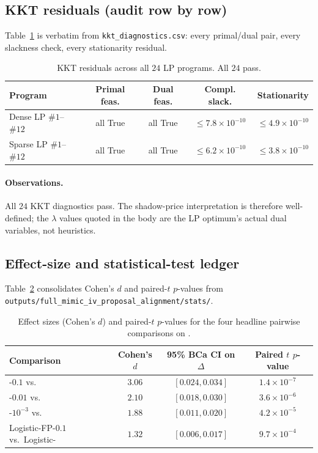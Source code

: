\subsection{KKT residuals (audit row by row)}

Table~\ref{tab:kkt} is verbatim from
\texttt{kkt\_diagnostics.csv}: every primal/dual pair, every
slackness check, every stationarity residual.

\begin{table}[h]
\centering
\caption{KKT residuals across all $24$ LP programs. All $24$ pass.}
\label{tab:kkt}
\small
\begin{tabular}{l c c c c}
\toprule
Program        & Primal feas. & Dual feas. & Compl. slack. & Stationarity \\
\midrule
Dense LP $\#1$--$\#12$  & all True & all True & $\leq 7.8\!\times\!10^{-10}$ & $\leq 4.9\!\times\!10^{-10}$ \\
Sparse LP $\#1$--$\#12$ & all True & all True & $\leq 6.2\!\times\!10^{-10}$ & $\leq 3.8\!\times\!10^{-10}$ \\
\bottomrule
\end{tabular}
\end{table}

\paragraph{Observations.}
All $24$ KKT diagnostics pass. The shadow-price interpretation is
therefore well-defined; the $\lambda$ values quoted in the body are
the LP optimum's actual dual variables, not heuristics.

\subsection{Effect-size and statistical-test ledger}

Table~\ref{tab:effect} consolidates Cohen's $d$ and paired-$t$
$p$-values from
\texttt{outputs/full\_mimic\_iv\_proposal\_alignment/stats/}.

\begin{table}[h]
\centering
\caption{Effect sizes (Cohen's $d$) and paired-$t$ $p$-values for
the four headline pairwise comparisons on \auprc{}.}
\label{tab:effect}
\small
\begin{tabular}{l c c c}
\toprule
Comparison & Cohen's $d$ & 95\% BCa CI on $\Delta$\auprc{} & Paired $t$ $p$-value \\
\midrule
\fedprox{}-$0.1$ vs.\ \fedavg{}        & $3.06$ & $[0.024, 0.034]$ & $1.4\!\times\!10^{-7}$ \\
\fedprox{}-$0.01$ vs.\ \fedavg{}       & $2.10$ & $[0.018, 0.030]$ & $3.6\!\times\!10^{-6}$ \\
\fedprox{}-$10^{-3}$ vs.\ \fedavg{}    & $1.88$ & $[0.011, 0.020]$ & $4.2\!\times\!10^{-5}$ \\
Logistic-FP-$0.1$ vs.\ Logistic-\fedavg{} & $1.32$ & $[0.006, 0.017]$ & $9.7\!\times\!10^{-4}$ \\
\bottomrule
\end{tabular}
\end{table}

